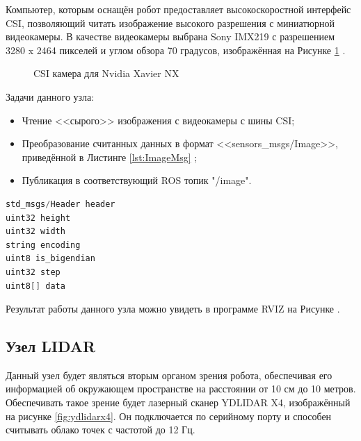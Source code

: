 \documentclass[12pt,a4paper]{scrartcl}
\begin{document}
			 	Компьютер, которым оснащён робот предоставляет высокоскоростной интерфейс CSI, позволяющий читать изображение высокого разрешения с миниатюрной видеокамеры. В качестве видеокамеры выбрана Sony IMX219 с разрешением 3280 x 2464 пикселей и углом обзора 70 градусов, изображённая на Рисунке \ref{fig:csiCam} . 
			 	\begin{figure}[h]
					\caption{CSI камера для Nvidia Xavier NX}
					\label{fig:csiCam}
				\end{figure}
				
				Задачи данного узла:
				\begin{itemize}
					\item Чтение <<сырого>> изображения с видеокамеры с шины CSI;
					\item Преобразование считанных данных в формат <<sensors\_msgs/Image>>, приведённой в Листинге \ref{lst:ImageMsg} ;
					\item Публикация в соответствующий ROS топик "/image".
				\end{itemize}
				
				\begin{lstlisting}[language=C,caption={Формат сообщения sensors\_msgs/Image},label={lst:ImageMsg}]
std_msgs/Header header
uint32 height
uint32 width
string encoding
uint8 is_bigendian
uint32 step
uint8[] data
				\end{lstlisting}	
				
				Результат работы данного узла можно увидеть в программе RVIZ на Рисунке .
				
			\subsection{Узел LIDAR} \label{sec:LiDAR}
				Данный узел будет являться вторым органом зрения робота, обеспечивая его информацией об окружающем пространстве на расстоянии от 10 см до 10 метров. Обеспечивать такое зрение будет лазерный сканер YDLIDAR X4, изображённый на рисунке \ref{fig:ydlidarx4}\cite{bib:ydlidarx4}. Он подключается по серийному порту и способен считывать облако точек с частотой до 12 Гц\cite{bib:ydlidarx4}. 
				
\end{document}
